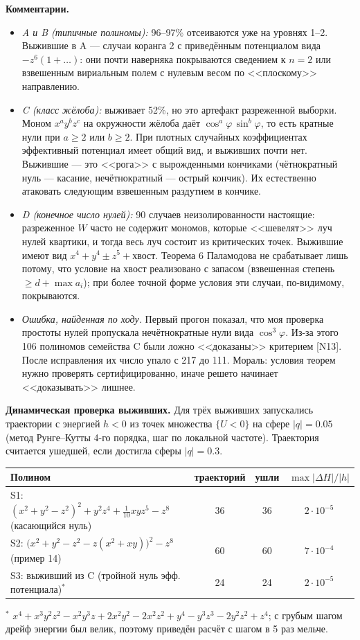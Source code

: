 \documentclass[11pt,a4paper]{article}
\begin{document}
\noindent\textbf{Комментарии.}
\begin{itemize}[leftmargin=*]
\item \emph{A и B (типичные полиномы):} 96--97\% отсеиваются уже на уровнях 1--2. Выжившие в A --- случаи
коранга 2 с приведённым потенциалом вида $-z^6(1+\dots)$: они почти наверняка покрываются сведением к
$n=2$ или взвешенным вириальным полем с нулевым весом по <<плоскому>> направлению.
\item \emph{C (класс жёлоба):} выживает 52\%, но это артефакт разреженной выборки. Моном
$x^ay^bz^c$ на окружности жёлоба даёт $\cos^a\varphi\,\sin^b\varphi$, то есть кратные нули при $a\ge2$ или
$b\ge2$. При плотных случайных коэффициентах эффективный потенциал имеет общий вид, и выживших почти нет.
Выжившие --- это <<рога>> с вырожденными кончиками (чётнократный нуль --- касание, нечётнократный ---
острый кончик). Их естественно атаковать следующим взвешенным раздутием в кончике.
\item \emph{D (конечное число нулей):} 90 случаев неизолированности настоящие: разреженное $W$ часто не
содержит мономов, которые <<шевелят>> луч нулей квартики, и тогда весь луч состоит из критических точек.
Выжившие имеют вид $x^4+y^4\pm z^5+{}$хвост. Теорема 6 Паламодова не срабатывает лишь потому, что
условие на хвост реализовано с запасом (взвешенная степень $\ge d+\max a_i$); при более точной форме
условия эти случаи, по-видимому, покрываются.
\item \emph{Ошибка, найденная по ходу.} Первый прогон показал, что моя проверка простоты нулей
пропускала нечётнократные нули вида $\cos^3\varphi$. Из-за этого 106 полиномов семейства C были ложно
<<доказаны>> критерием [N13]. После исправления их число упало с 217 до 111. Мораль: условия теорем нужно
проверять сертифицированно, иначе решето начинает <<доказывать>> лишнее.
\end{itemize}

\noindent\textbf{Динамическая проверка выживших.} Для трёх выживших запускались траектории с энергией $h<0$ из точек множества $\{U<0\}$ на сфере
$|q|=0.05$ (метод Рунге--Кутты 4-го порядка, шаг по локальной частоте). Траектория считается ушедшей,
если достигла сферы $|q|=0.3$.
\begin{center}\footnotesize\setlength{\tabcolsep}{4pt}
\begin{tabular}{p{9.2cm}ccc}
\toprule
Полином & траекторий & ушли & $\max|\Delta H|/|h|$\\
\midrule
S1: $(x^2+y^2-z^2)^2+y^2z^4+\frac1{10}xyz^5-z^8$ (касающийся нуль) & 36 & 36 & $2\cdot10^{-5}$\\
S2: $\bigl(x^2+y^2-z^2-z(x^2+xy)\bigr)^2-z^8$ (пример 14) & 60 & 60 & $7\cdot10^{-4}$\\
S3: выживший из C (тройной нуль эфф. потенциала)$^*$ & 24 & 24 & $2\cdot10^{-5}$\\
\bottomrule
\end{tabular}
\end{center}
{\footnotesize $^*$ $x^4+x^3y^2z^2-x^2y^3z+2x^2y^2-2x^2z^2+y^4-y^3z^3-2y^2z^2+z^4$; с грубым шагом дрейф энергии
был велик, поэтому приведён расчёт с шагом в 5 раз мельче.}
\end{document}
